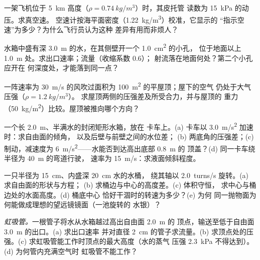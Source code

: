 \begin{exercise}[$\star$]\label{exo:b2:euler-bernoulli:2}
一架飞机位于 \qty{5}{km} 高度（$\rho = \qty{0.74}{kg/m^3}$）时，其皮托管
读数为 \qty{15}{kPa} 的动压。求真空速。
空速计按海平面密度（\qty{1.22}{kg/m^3}）校准，它显示的
“指示空速”为多少？为什么飞行员认为这种
差异有用而非烦人？
\end{exercise}

\begin{exercise}[$\star$]\label{exo:b2:euler-bernoulli:3}
水箱中盛有深 \qty{3.0}{m} 的水，在其侧壁开一个 \qty{1.0}{cm^2} 的小孔，
位于地面以上 \qty{1.0}{m} 处。求出口速率；流量（收缩系数 $0.6$）；
射流落在地面何处？第二个小孔应开在
何深度处，才能落到同一点？
\end{exercise}

\begin{exercise}[$\star$]\label{exo:b2:euler-bernoulli:4}
一阵速率为 \qty{30}{m/s} 的风吹过面积为 \qty{100}{m^2} 的平屋顶；屋下的空气
仍处于大气压强（$\rho = \qty{1.2}{kg/m^3}$）。
求屋顶两侧的压强差及所受合力，并与屋顶的
重力（\qty{50}{kg/m^2}）比较。屋顶被推向哪个方向？
\end{exercise}

\begin{exercise}[$\star\star$]\label{exo:b2:euler-bernoulli:5}
一个长 \qty{2.0}{m}、半满水的封闭矩形水箱，放在
卡车上。(a) 卡车以 \qty{3.0}{m/s^2} 加速时：求自由面的倾角，
以及后壁与前壁之间的水位差；
(b) 两底角的压强差；(c)
制动，减速度为 \qty{6}{m/s^2}——水能否到达高出底部 \qty{0.8}{m} 的
顶盖？(d) 同一卡车绕半径为 \qty{40}{m} 的弯道行驶，
速率为 \qty{15}{m/s}：求液面倾斜程度。
\end{exercise}

\begin{exercise}[$\star\star$]\label{exo:b2:euler-bernoulli:6}
一只半径为 \qty{15}{cm}、内盛深 \qty{20}{cm} 水的水桶，
绕其轴以 \qty{2.0}{turns/s} 旋转。(a) 求自由面的形状与方程；
(b) 求桶边与中心的高度差。(c) 体积守恒，
求中心与桶边处的水面高度。(d) 桶底中心
恰好干涸时的转速为多少？(e) 为何
同一抛物面为何能做成理想的望远镜镜面（一池旋转的
水银）？
\end{exercise}

\begin{exercise}[$\star\star$]\label{exo:b2:euler-bernoulli:7}
\emph{虹吸管。}一根管子将水从水箱越过高出自由面 \qty{2.0}{m} 的
顶点，输送至低于自由面 \qty{3.0}{m} 的出口。(a) 求出口速率
并对直径 \qty{2}{cm} 的管子求流量。(b) 求顶点处的压强。(c)
求虹吸管能工作时顶点的最大高度（水的蒸气
压强 \qty{2.3}{kPa} 不得达到）。(d) 为何管内充满空气时
虹吸管不能工作？
\end{exercise}

